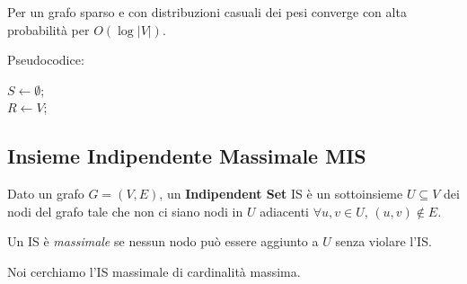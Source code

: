 Per un grafo sparso e con distribuzioni casuali dei pesi converge con alta probabilità per $O(\log |V|)$.

Pseudocodice:
\begin{center}
    \begin{minipage}{.81\textwidth}
        \begin{tcolorbox}[
            colback=white,
            sharp corners,
            boxrule=.3mm,
            left=20pt,
            top=0pt,
            bottom=0pt,
            colbacktitle=white,
            coltitle=black
            ]
            \LinesNumbered
            \begin{algorithm}[H]
                \SetAlgoNoEnd
                $S \leftarrow \emptyset$; \\
                $R \leftarrow V$;  \\
            \end{algorithm}
        \end{tcolorbox}
    \end{minipage}
\end{center}

\subsection{Insieme Indipendente Massimale MIS}

Dato un grafo $G = (V,E)$, un \textbf{Indipendent Set} IS è un sottoinsieme $U \subseteq V$ dei nodi del grafo tale che non ci siano nodi in $U$ adiacenti $\forall u,v \in U$, $(u,v) \notin E$.

Un IS è \textit{massimale} se nessun nodo può essere aggiunto a $U$ senza violare l'IS.

Noi cerchiamo l'IS massimale di cardinalità massima.

